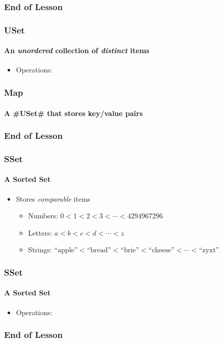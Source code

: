 \documentclass[aspectratio=169,xcolor=dvipsnames]{beamer}
\makeatletter
\renewcommand{\emph}[1]{{\itshape\color{blue}#1}}
\newcommand{\emphen}[1]{{\itshape #1}}
\def\title#1{\gdef\@title{#1}\gdef\THETITLE{#1}}
\newcommand{\blank}{\begin{frame}\frametitle{End of Lesson}\end{frame}}
\newcommand{\titler}[1]{\blank\title{#1}\begin{frame}\titlepage\end{frame}}
\makeatother
\begin{document}
\titler{The USet (Unordered Set) Interface}


\begin{frame}
  \frametitle{USet}
  \framesubtitle{An \emphen{unordered} collection of \emphen{distinct} items}
  \begin{itemize}
    \item<+-> Operations: %
  \end{itemize}
     \begin{center}
     \end{center}

\end{frame}

\begin{frame}
  \frametitle{Map}
  \framesubtitle{A #USet# that stores key/value pairs}
 
     \begin{center}
     \end{center}
\end{frame}

\titler{The SSet (Sorted Set) Interface}

\begin{frame}
  \frametitle{SSet}
  \framesubtitle{A Sorted Set}
 
  \begin{itemize}
    \item<+->Stores \emph{comparable} items
    \begin{itemize}
       \item<+-> Numbers: $0 < 1 < 2 < 3 < \cdots < 4294967296$
       \item<+-> Letters: $a < b < c < d < \cdots < z$
       \item<+-> Strings: $\text{``apple''} < \text{``bread''} < \text{``brie''} 
                           < \text{``cheese''} < \cdots < \text{``zyxt''}$
    \end{itemize}
  \end{itemize}
\end{frame}

\begin{frame}
  \frametitle{SSet}
  \framesubtitle{A Sorted Set}

  \begin{itemize}
    \item<+-> Operations: %
  \end{itemize}
  \begin{center}
  \end{center}
\end{frame}

\titler{}
\end{document}
